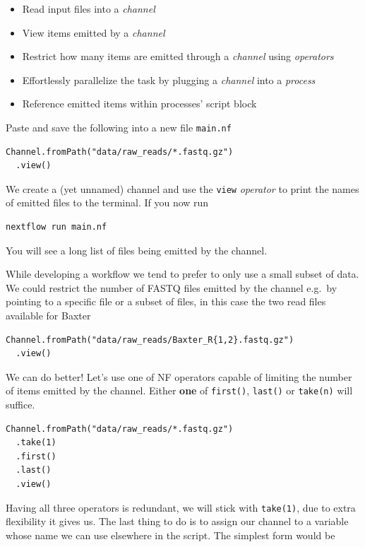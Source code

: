 \begin{itemize}
 \item Read input files into a \emph{channel}
 \item View items emitted by a \emph{channel}
 \item Restrict how many items are emitted through a \emph{channel} using \emph{operators}
 \item Effortlessly parallelize the task by plugging a \emph{channel} into a \emph{process}
 \item Reference emitted items within processes' script block
\end{itemize}

\begin{steps}
Paste and save the following into a new file \texttt{main.nf}
\begin{lstlisting}
Channel.fromPath("data/raw_reads/*.fastq.gz")
  .view()
\end{lstlisting}

We create a (yet unnamed) channel and use the \texttt{view} \emph{operator} to
print the names of emitted files to the terminal. If you now run 


\begin{lstlisting}
nextflow run main.nf
\end{lstlisting}
\end{steps}

You will see a long list of files being emitted by the channel. 

While developing a workflow we tend to prefer to only use a small subset of data. 
We could restrict the number of FASTQ files emitted by the channel 
e.g.\ by pointing to a specific file or a subset of files, 
in this case the two read files available for Baxter

\begin{lstlisting}
Channel.fromPath("data/raw_reads/Baxter_R{1,2}.fastq.gz")
  .view()
\end{lstlisting}

We can do better! Let's use one of NF operators capable of limiting the number of items emitted by the channel.
Either \textbf{one} of \texttt{first()}, \texttt{last()} or \texttt{take(n)} will suffice.  


\begin{lstlisting}
Channel.fromPath("data/raw_reads/*.fastq.gz")
  .take(1) 
  .first() 
  .last() 
  .view()
\end{lstlisting}

Having all three operators is redundant, we will stick with \texttt{take(1)},
due to extra flexibility it gives us.
The last thing to do is to assign our channel to a variable whose name we can use elsewhere in the script.
The simplest form would be

